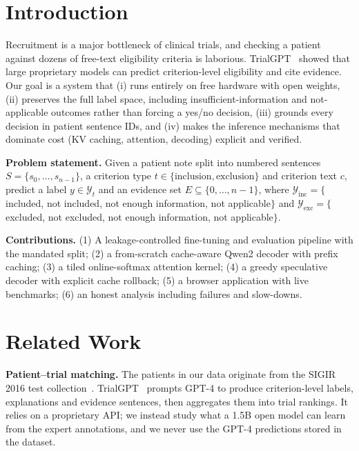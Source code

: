 \documentclass[conference]{IEEEtran}
\begin{document}
\section{Introduction}
Recruitment is a major bottleneck of clinical trials, and checking a patient against dozens of free-text eligibility criteria is laborious. TrialGPT~\cite{jin2024trialgpt} showed that large proprietary models can predict criterion-level eligibility and cite evidence. Our goal is a system that (i) runs entirely on free hardware with open weights, (ii) preserves the full label space, including insufficient-information and not-applicable outcomes rather than forcing a yes/no decision, (iii) grounds every decision in patient sentence IDs, and (iv) makes the inference mechanisms that dominate cost (KV caching, attention, decoding) explicit and verified.

\textbf{Problem statement.} Given a patient note split into numbered sentences $S=\{s_0,\dots,s_{n-1}\}$, a criterion type $t\in\{\text{inclusion},\text{exclusion}\}$ and criterion text $c$, predict a label $y\in\mathcal{Y}_t$ and an evidence set $E\subseteq\{0,\dots,n-1\}$, where $\mathcal{Y}_{\text{inc}}=\{$included, not included, not enough information, not applicable$\}$ and $\mathcal{Y}_{\text{exc}}=\{$excluded, not excluded, not enough information, not applicable$\}$.

\textbf{Contributions.} (1) A leakage-controlled fine-tuning and evaluation pipeline with the mandated split; (2) a from-scratch cache-aware Qwen2 decoder with prefix caching; (3) a tiled online-softmax attention kernel; (4) a greedy speculative decoder with explicit cache rollback; (5) a browser application with live benchmarks; (6) an honest analysis including failures and slow-downs.

\section{Related Work}
\textbf{Patient--trial matching.} The patients in our data originate from the SIGIR 2016 test collection~\cite{koopman2016test}. TrialGPT~\cite{jin2024trialgpt} prompts GPT-4 to produce criterion-level labels, explanations and evidence sentences, then aggregates them into trial rankings. It relies on a proprietary API; we instead study what a 1.5B open model can learn from the expert annotations, and we never use the GPT-4 predictions stored in the dataset.
\end{document}
